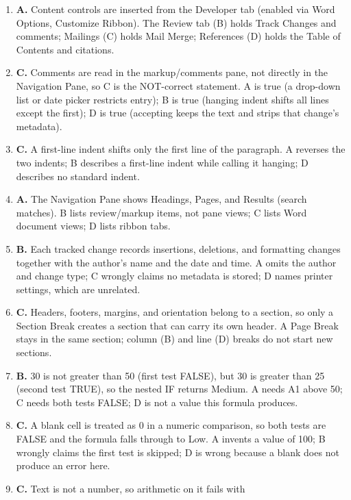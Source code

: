 \begin{enumerate}[label=\textbf{Q\arabic*.}, leftmargin=*]
\item \textbf{A.} Content controls are inserted from the Developer tab (enabled
  via Word Options, Customize Ribbon). The Review tab (B) holds Track Changes
  and comments; Mailings (C) holds Mail Merge; References (D) holds the Table
  of Contents and citations.
\item \textbf{C.} Comments are read in the markup/comments pane, not directly
  in the Navigation Pane, so C is the NOT-correct statement. A is true (a
  drop-down list or date picker restricts entry); B is true (hanging indent
  shifts all lines except the first); D is true (accepting keeps the text and
  strips that change's metadata).
\item \textbf{C.} A first-line indent shifts only the first line of the
  paragraph. A reverses the two indents; B describes a first-line indent while
  calling it hanging; D describes no standard indent.
\item \textbf{A.} The Navigation Pane shows Headings, Pages, and Results
  (search matches). B lists review/markup items, not pane views; C lists Word
  document views; D lists ribbon tabs.
\item \textbf{B.} Each tracked change records insertions, deletions, and
  formatting changes together with the author's name and the date and time. A
  omits the author and change type; C wrongly claims no metadata is stored; D
  names printer settings, which are unrelated.
\item \textbf{C.} Headers, footers, margins, and orientation belong to a
  section, so only a Section Break creates a section that can carry its own
  header. A Page Break stays in the same section; column (B) and line (D)
  breaks do not start new sections.
\item \textbf{B.} 30 is not greater than 50 (first test FALSE), but 30 is
  greater than 25 (second test TRUE), so the nested IF returns Medium. A needs
  A1 above 50; C needs both tests FALSE; D is not a value this formula
  produces.
\item \textbf{C.} A blank cell is treated as 0 in a numeric comparison, so
  both tests are FALSE and the formula falls through to Low. A invents a value
  of 100; B wrongly claims the first test is skipped; D is wrong because a
  blank does not produce an error here.
\item \textbf{C.} Text is not a number, so arithmetic on it fails with

\end{enumerate}
